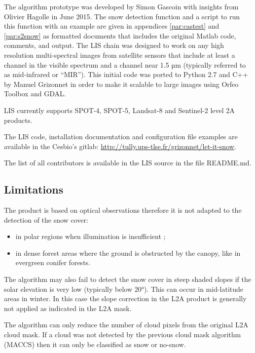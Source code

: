 \documentclass[a4paper]{article}
\begin{document}
The algorithm prototype was developed by Simon Gascoin with insights from
Olivier Hagolle in June 2015.  The snow detection function and a script to run
this function with an example are given in appendices \ref{par:castest} and
\ref{par:s2snow} as formatted documents that includes the original Matlab code,
comments, and output. The LIS chain was designed to work on any high resolution
multi-spectral images from satellite sensors that include at least a channel in
the visible spectrum and a channel near 1.5 µm (typically referred to as
mid-infrared or ``MIR''). This initial code was ported to Python 2.7 and C++ by
Manuel Grizonnet in order to make it scalable to large images using Orfeo
Toolbox and GDAL.

LIS currently supports SPOT-4, SPOT-5, Landsat-8 and
Sentinel-2 level 2A products.

The LIS code, installation documentation and configuration file examples are
available in the Cesbio's gitlab:
\url{http://tully.ups-tlse.fr/grizonnet/let-it-snow}.

The list of all contributors is available in the LIS source in the file README.md.

\subsection{Limitations}

The product is based on optical observations therefore it is not adapted to the detection of the snow cover:

\begin{itemize}
 \item in polar regions when illumination is insufficient ;
  \item in dense forest areas where the ground is obstructed by the canopy, like in evergreen conifer forests.
 \end{itemize}
 
The algorithm may also fail to detect the snow cover in steep shaded slopes if the solar elevation is very low (typically below 20°). This can occur in mid-latitude areas in winter. In this case the slope correction in the L2A product is generally not applied as indicated in the L2A mask.

The algorithm can only reduce the number of cloud pixels from the original L2A cloud mask. If a cloud was not detected by the previous cloud mask algorithm (MACCS) then it can only be classified as snow or no-snow. 
\end{document}
